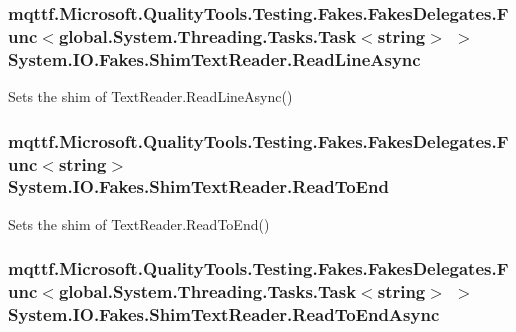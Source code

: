 \hypertarget{class_system_1_1_i_o_1_1_fakes_1_1_shim_text_reader_a7a05488d7a6d02c9ed0e844fb25e182a}{
\subsubsection[{Read\-Line\-Async}]{\setlength{\rightskip}{0pt plus 5cm}mqttf.\-Microsoft.\-Quality\-Tools.\-Testing.\-Fakes.\-Fakes\-Delegates.\-Func$<$global.\-System.\-Threading.\-Tasks.\-Task$<$string$>$ $>$ System.\-I\-O.\-Fakes.\-Shim\-Text\-Reader.\-Read\-Line\-Async\hspace{0.3cm}{\ttfamily [set]}}}\label{class_system_1_1_i_o_1_1_fakes_1_1_shim_text_reader_a7a05488d7a6d02c9ed0e844fb25e182a}


Sets the shim of Text\-Reader.\-Read\-Line\-Async()

\hypertarget{class_system_1_1_i_o_1_1_fakes_1_1_shim_text_reader_a763280d7413277fa360291c8330df838}{
\subsubsection[{Read\-To\-End}]{\setlength{\rightskip}{0pt plus 5cm}mqttf.\-Microsoft.\-Quality\-Tools.\-Testing.\-Fakes.\-Fakes\-Delegates.\-Func$<$string$>$ System.\-I\-O.\-Fakes.\-Shim\-Text\-Reader.\-Read\-To\-End\hspace{0.3cm}{\ttfamily [set]}}}\label{class_system_1_1_i_o_1_1_fakes_1_1_shim_text_reader_a763280d7413277fa360291c8330df838}


Sets the shim of Text\-Reader.\-Read\-To\-End()

\hypertarget{class_system_1_1_i_o_1_1_fakes_1_1_shim_text_reader_ae7db21fabd2e4bdb5b4a2be257ccbbd1}{
\subsubsection[{Read\-To\-End\-Async}]{\setlength{\rightskip}{0pt plus 5cm}mqttf.\-Microsoft.\-Quality\-Tools.\-Testing.\-Fakes.\-Fakes\-Delegates.\-Func$<$global.\-System.\-Threading.\-Tasks.\-Task$<$string$>$ $>$ System.\-I\-O.\-Fakes.\-Shim\-Text\-Reader.\-Read\-To\-End\-Async\hspace{0.3cm}{\ttfamily [set]}}}\label{class_system_1_1_i_o_1_1_fakes_1_1_shim_text_reader_ae7db21fabd2e4bdb5b4a2be257ccbbd1}


